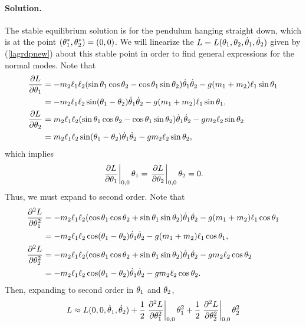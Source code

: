 \documentclass[11pt]{article}
\newcommand{\refeq}[1]{(\ref{#1})}
\newenvironment{solution}
{
    \paragraph{Solution.}
    \ignorespaces
}
{
    \bigskip
}
\begin{document}
\begin{solution}
	The stable equilibrium solution is for the pendulum hanging straight down, which is at the point $(\theta_1^*, \theta_2^*) = (0, 0)$.  We will linearize the $L = L(\theta_1, \theta_2, \dot{\theta}_1, \dot{\theta}_2)$ given by \refeq{lagrdpnew} about this stable point in order to find general expressions for the normal modes.  Note that
	\begin{align}
		\pdv{L}{\theta_1} &= -m_2 \ell_1 \ell_2 (\sin{\theta_1} \cos{\theta_2} - \cos{\theta_1} \sin{\theta_2}) \dot{\theta}_1 \dot{\theta}_2 - g (m_1 + m_2) \ell_1 \sin{\theta_1} \\
		&= -m_2 \ell_1 \ell_2 \sin(\theta_1 - \theta_2) \dot{\theta}_1 \dot{\theta}_2 - g (m_1 + m_2) \ell_1 \sin{\theta_1}, \\
		\pdv{L}{\theta_2} &= m_2 \ell_1 \ell_2 (\sin{\theta_1} \cos{\theta_2} - \cos{\theta_1} \sin{\theta_2}) \dot{\theta}_1 \dot{\theta}_2 - g m_2 \ell_2 \sin{\theta_2} \\
		&= m_2 \ell_1 \ell_2 \sin(\theta_1 - \theta_2) \dot{\theta}_1 \dot{\theta}_2 - g m_2 \ell_2 \sin{\theta_2},
	\end{align}
	which implies
	\begin{equation}
		\left. \pdv{L}{\theta_1}\right|_{0, 0} \theta_1 = \left. \pdv{L}{\theta_2}\right|_{0, 0} \theta_2 = 0.
	\end{equation}
	Thus, we must expand to second order.  Note that
	\begin{align}
		\pdv[2]{L}{\theta_1} &= -m_2 \ell_1 \ell_2 (\cos{\theta_1} \cos{\theta_2} + \sin{\theta_1} \sin{\theta_2}) \dot{\theta}_1 \dot{\theta}_2 - g (m_1 + m_2) \ell_1 \cos{\theta_1} \\
		&= -m_2 \ell_1 \ell_2 \cos(\theta_1 - \theta_2) \dot{\theta}_1 \dot{\theta}_2 - g (m_1 + m_2) \ell_1 \cos{\theta_1}, \\
		\pdv[2]{L}{\theta_2} &= -m_2 \ell_1 \ell_2 (\cos{\theta_1} \cos{\theta_2} + \sin{\theta_1} \sin{\theta_2}) \dot{\theta}_1 \dot{\theta}_2 - g m_2 \ell_2 \cos{\theta_2} \\
		&= -m_2 \ell_1 \ell_2 \cos(\theta_1 - \theta_2) \dot{\theta}_1 \dot{\theta}_2 - g m_2 \ell_2 \cos{\theta_2}.
	\end{align}
	Then, expanding to second order in $\theta_1$ and $\theta_2$, %
	\begin{align}
		L &\approx L(0, 0, \thdq, \thdw) + \frac{1}{2} \left. \pdv[2]{L}{\thq}\right|_{0, 0} \thq^2 + \frac{1}{2} \left. \pdv[2]{L}{\thw}\right|_{0, 0} \thw^2 \\

\end{align}
\end{solution}
\end{document}
